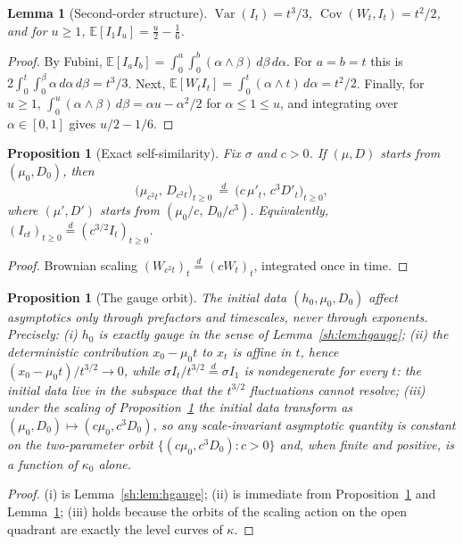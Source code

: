 \documentclass[11pt]{article}
\numberwithin{equation}{section}
\theoremstyle{plain}
\newtheorem{proposition}[theorem]{Proposition}
\newtheorem{lemma}[theorem]{Lemma}
\theoremstyle{definition}
\theoremstyle{remark}
\newcommand{\E}{\mathbb{E}}
\DeclareMathOperator{\Var}{Var}
\DeclareMathOperator{\Cov}{Cov}
\newcommand{\eqd}{\overset{d}{=}}
\begin{document}
\begin{lemma}[Second-order structure]\label{sh:lem:secondorder}
$\Var(I_t)=t^3/3$, $\Cov(W_t,I_t)=t^2/2$, and for $u\ge1$,
$\E[I_1I_u]=\tfrac u2-\tfrac16$.
\end{lemma}

\begin{proof}
By Fubini, $\E[I_aI_b]=\int_0^a\!\int_0^b(\alpha\wedge\beta)\,d\beta\,d\alpha$.
For $a=b=t$ this is $2\int_0^t\!\int_0^\beta\alpha\,d\alpha\,d\beta=t^3/3$.
Next, $\E[W_tI_t]=\int_0^t(\alpha\wedge t)\,d\alpha=t^2/2$. Finally, for
$u\ge1$, $\int_0^u(\alpha\wedge\beta)\,d\beta
=\alpha u-\alpha^2/2$ for $\alpha\le1\le u$, and integrating over
$\alpha\in[0,1]$ gives $u/2-1/6$.
\end{proof}

\begin{proposition}[Exact self-similarity]\label{sh:prop:selfsim}
Fix $\sigma$ and $c>0$. If $(\mu,D)$ starts from $(\mu_0,D_0)$, then
\[
\bigl(\mu_{c^2t},\,D_{c^2t}\bigr)_{t\ge0}\ \eqd\
\bigl(c\,\mu'_t,\,c^3D'_t\bigr)_{t\ge0},
\]
where $(\mu',D')$ starts from $(\mu_0/c,\,D_0/c^3)$. Equivalently,
$(I_{ct})_{t\ge0}\eqd(c^{3/2}I_t)_{t\ge0}$.
\end{proposition}

\begin{proof}
Brownian scaling $(W_{c^2t})_t\eqd(cW_t)_t$, integrated once in time.
\end{proof}

\begin{proposition}[The gauge orbit]\label{sh:prop:gauge}
The initial data $(h_0,\mu_0,D_0)$ affect asymptotics only through
prefactors and timescales, never through exponents. Precisely:
\emph{(i)} $h_0$ is exactly gauge in the sense of
Lemma~\ref{sh:lem:hgauge};
\emph{(ii)} the deterministic contribution
$x_0-\mu_0t$ to $x_t$ is affine in $t$, hence
$(x_0-\mu_0t)/t^{3/2}\to0$, while $\sigma I_t/t^{3/2}\eqd\sigma I_1$ is
nondegenerate for every $t$: the initial data live in the subspace that the
$t^{3/2}$ fluctuations cannot resolve;
\emph{(iii)} under the scaling of Proposition~\ref{sh:prop:selfsim} the
initial data transform as $(\mu_0,D_0)\mapsto(c\mu_0,c^3D_0)$, so any
scale-invariant asymptotic quantity is constant on the two-parameter orbit
$\{(c\mu_0,c^3D_0):c>0\}$ and, when finite and positive, is a function of
$\kappa_0$ alone.
\end{proposition}

\begin{proof}
(i) is Lemma~\ref{sh:lem:hgauge}; (ii) is immediate from
Proposition~\ref{sh:prop:selfsim} and Lemma~\ref{sh:lem:secondorder};
(iii) holds because the orbits of the scaling action on the open quadrant
are exactly the level curves of $\kappa$.
\end{proof}
\end{document}
